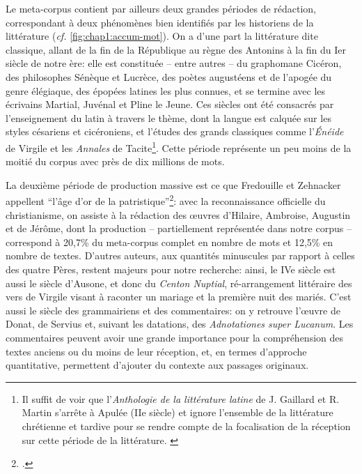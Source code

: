 Le meta-corpus contient par ailleurs deux grandes périodes de rédaction, correspondant à deux phénomènes bien identifiés par les historiens de la littérature (\textit{cf.} \ref{fig:chap1:accum-mot}). On a d'une part la littérature dite classique, allant de la fin de la République au règne des Antonins à la fin du Ier siècle de notre ère: elle est constituée -- entre autres -- du graphomane Cicéron, des philosophes Sénèque et Lucrèce, des poètes augustéens et de l'apogée du genre élégiaque, des épopées latines les plus connues, et se termine avec les écrivains Martial, Juvénal et Pline le Jeune. Ces siècles ont été consacrés par l'enseignement du latin à travers le thème, dont la langue est calquée sur les styles césariens et cicéroniens, et l'études des grands classiques comme l'\textit{Énéide} de Virgile et les \textit{Annales} de Tacite\footnote{Il suffit de voir que l'\textit{Anthologie de la littérature latine} de J. Gaillard et R. Martin s'arrête à Apulée (IIe siècle) et ignore l'ensemble de la littérature chrétienne et tardive pour se rendre compte de la focalisation de la réception sur cette période de la littérature. \textcite{gaillard_anthologie_2005}}. Cette période représente un peu moins de la moitié du corpus avec près de dix millions de mots. 

La deuxième période de production massive est ce que Fredouille et Zehnacker appellent \enquote{l'âge d'or de la patristique}\footcite{zehnacker_litterature_2013}: avec la reconnaissance officielle du christianisme, on assiste à la rédaction des œuvres d'Hilaire, Ambroise, Augustin et de Jérôme, dont la production -- partiellement représentée dans notre corpus -- correspond à 20,7\% du meta-corpus complet en nombre de mots et 12,5\% en nombre de textes. D'autres auteurs, aux quantités minuscules par rapport à celles des quatre Pères, restent majeurs pour notre recherche: ainsi, le IVe siècle est aussi le siècle d'Ausone, et donc du \textit{Centon Nuptial}, ré-arrangement littéraire des vers de Virgile visant à raconter un mariage et la première nuit des mariés. C'est aussi le siècle des grammairiens et des commentaires: on y retrouve l'œuvre de Donat, de Servius et, suivant les datations, des \textit{Adnotationes super Lucanum}. Les commentaires peuvent avoir une grande importance pour la compréhension des textes anciens ou du moins de leur réception, et, en termes d'approche quantitative, permettent d'ajouter du contexte aux passages originaux.

